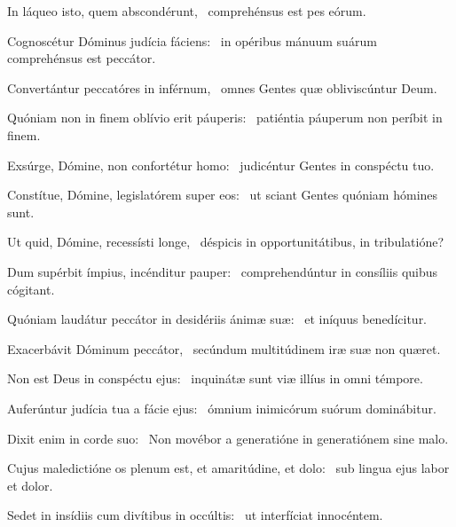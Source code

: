 \item In láqueo isto, quem abscondérunt,~\psstar{} comprehénsus est pes eórum.

\item Cognoscétur Dóminus judícia fáciens:~\psstar{} in opéribus mánuum suárum comprehénsus est peccátor.

\item Convertántur peccatóres in inférnum,~\psstar{} omnes Gentes quæ obliviscúntur Deum.

\item Quóniam non in finem oblívio erit páuperis:~\psstar{} patiéntia páuperum non períbit in finem.

\item Exsúrge, Dómine, non confortétur homo:~\psstar{} judicéntur Gentes in conspéctu tuo.

\item Constítue, Dómine, legislatórem super eos:~\psstar{} ut sciant Gentes quóniam hómines sunt.

\item Ut quid, Dómine, recessísti longe,~\psstar{} déspicis in opportunitátibus, in tribulatióne?

\item Dum supérbit ímpius, incénditur pauper:~\psstar{} comprehendúntur in consíliis quibus cógitant.

\item Quóniam laudátur peccátor in desidériis ánimæ suæ:~\psstar{} et iníquus benedícitur.

\item Exacerbávit Dóminum peccátor,~\psstar{} secúndum multitúdinem iræ suæ non quæret.

\item Non est Deus in conspéctu ejus:~\psstar{} inquinátæ sunt viæ illíus in omni témpore.

\item Auferúntur judícia tua a fácie ejus:~\psstar{} ómnium inimicórum suórum dominábitur.

\item Dixit enim in corde suo:~\psstar{} Non movébor a generatióne in generatiónem sine malo.

\item Cujus maledictióne os plenum est, et amaritúdine, et dolo:~\psstar{} sub lingua ejus labor et dolor.

\item Sedet in insídiis cum divítibus in occúltis:~\psstar{} ut interfíciat innocéntem.

